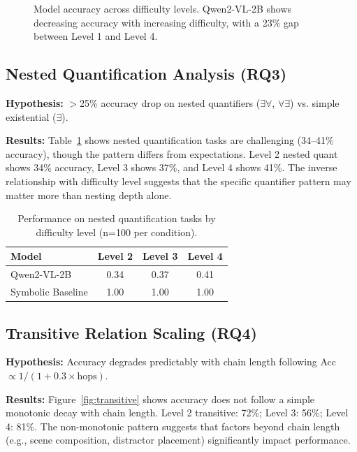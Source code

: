 \documentclass[11pt,a4paper]{article}
\begin{document}
\begin{figure}[t]
\centering
{}
\caption{Model accuracy across difficulty levels. Qwen2-VL-2B shows decreasing accuracy with increasing difficulty, with a 23\% gap between Level 1 and Level 4.}
\label{fig:accuracy}
\end{figure}

\subsection{Nested Quantification Analysis (RQ3)}

\textbf{Hypothesis:} $>$25\% accuracy drop on nested quantifiers ($\exists\forall$, $\forall\exists$) vs. simple existential ($\exists$).

\textbf{Results:} Table~\ref{tab:nested} shows nested quantification tasks are challenging (34--41\% accuracy), though the pattern differs from expectations. Level 2 nested quant shows 34\% accuracy, Level 3 shows 37\%, and Level 4 shows 41\%. The inverse relationship with difficulty level suggests that the specific quantifier pattern may matter more than nesting depth alone.

\begin{table}[t]
\caption{Performance on nested quantification tasks by difficulty level (n=100 per condition).}
\label{tab:nested}
\centering
\begin{tabular}{lccc}
\toprule
\textbf{Model} & \textbf{Level 2} & \textbf{Level 3} & \textbf{Level 4} \\
\midrule
Qwen2-VL-2B & 0.34 & 0.37 & 0.41 \\
Symbolic Baseline & 1.00 & 1.00 & 1.00 \\
\bottomrule
\end{tabular}
\end{table}

\subsection{Transitive Relation Scaling (RQ4)}

\textbf{Hypothesis:} Accuracy degrades predictably with chain length following Acc $\propto 1/(1+0.3 \times \text{hops})$.

\textbf{Results:} Figure~\ref{fig:transitive} shows accuracy does not follow a simple monotonic decay with chain length. Level 2 transitive: 72\%; Level 3: 56\%; Level 4: 81\%. The non-monotonic pattern suggests that factors beyond chain length (e.g., scene composition, distractor placement) significantly impact performance.
\end{document}
